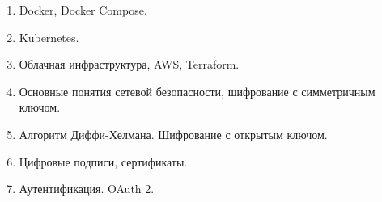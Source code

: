 \documentclass[a5paper]{article}
\begin{document}
\begin{enumerate}
    \item Docker, Docker Compose.
    \item Kubernetes.
    \item Облачная инфраструктура, AWS, Terraform.
    \item Основные понятия сетевой безопасности, шифрование с симметричным ключом.
    \item Алгоритм Диффи-Хелмана. Шифрование с открытым ключом.
    \item Цифровые подписи, сертификаты.
    \item Аутентификация. OAuth 2.
\end{enumerate}
\end{document}
